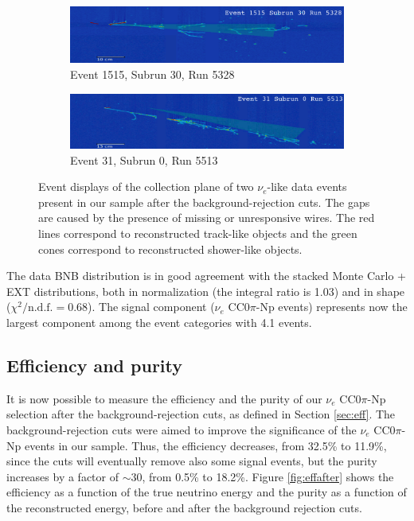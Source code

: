 \begin{figure}[htbp]
\centering
  \begin{subfigure}{0.7\textwidth}
  \includegraphics[width=\linewidth]{figures/data1.png}
    \caption{Event 1515, Subrun 30, Run 5328}
\end{subfigure}
  \begin{subfigure}{0.7\textwidth}	
  \includegraphics[width=\linewidth]{figures/data2.png}
  \caption{Event 31, Subrun 0, Run 5513}
\end{subfigure}

  \caption{Event displays of the collection plane of two $\nu_{e}$-like data events present in our sample after the background-rejection cuts. The gaps are caused by the presence of missing or unresponsive wires. The red lines correspond to reconstructed track-like objects and the green cones correspond to reconstructed shower-like objects. }
  \label{fig:evds}
\end{figure}

The data BNB distribution is in good agreement with the stacked Monte Carlo + EXT distributions, both in normalization (the integral ratio is 1.03) and in shape ($\chi^2 /\mathrm{n.d.f.} = 0.68$). The signal component ($\nu_{e}$ CC0$\pi$-Np events) represents now the largest component among the event categories with 4.1 events. 

\subsection{Efficiency and purity}
It is now possible to measure the efficiency and the purity of our $\nu_{e}$ CC0$\pi$-Np selection after the background-rejection cuts, as defined in Section \ref{sec:eff}. The background-rejection cuts were aimed to improve the significance of the $\nu_{e}$ CC0$\pi$-Np events in our sample. Thus, the efficiency decreases, from 32.5\% to 11.9\%, since the cuts will eventually remove also some signal events, but the purity increases by a factor of $\sim30$, from 0.5\% to 18.2\%. Figure \ref{fig:effafter} shows the efficiency as a function of the true neutrino energy and the purity as a function of the reconstructed energy, before and after the background rejection cuts. 

